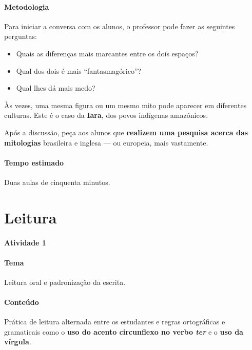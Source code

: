 \documentclass[11pt]{extarticle}
\begin{document}

\paragraph{Metodologia} Para iniciar a conversa com os alunos,
o professor pode fazer as seguintes perguntas:

\begin{itemize}
\item Quais as diferenças mais marcantes entre os dois espaços?
\item Qual dos dois é mais ``fantasmagórico''?
\item Qual lhes dá mais medo?
\end{itemize}

Às vezes, uma mesma figura ou um mesmo mito pode aparecer em diferentes culturas.
Este é o caso da \textbf{Iara}, dos povos indígenas amazônicos. 

Após a discussão, peça aos alunos que \textbf{realizem uma pesquisa acerca das mitologias} 
brasileira e inglesa --- ou europeia, mais vastamente. 


\paragraph{Tempo estimado} Duas aulas de cinquenta minutos.


\section{Leitura}

\paragraph{Atividade 1} 

\paragraph{Tema} Leitura oral e padronização da escrita.

\paragraph{Conteúdo} Prática de leitura alternada entre os estudantes 
e regras ortográficas e gramaticais como o \textbf{uso do acento circunflexo no 
verbo \textit{ter}} e o \textbf{uso da vírgula}.
\end{document}
